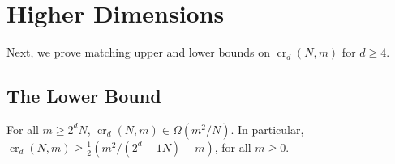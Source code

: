 \documentclass{patmorin}
\newcommand{\n}{N}
\DeclareMathOperator{\crs}{cr}
\begin{document}
\section{Higher Dimensions}

Next, we prove matching upper and lower bounds on $\crs_d(\n,m)$ for
$d\ge 4$.

\subsection{The Lower Bound}

\begin{thm}
  For all $m\ge 2^d\n$, $\crs_d(\n,m)\in\Omega(m^2/\n)$.  In particular,
  $\crs_d(\n,m)\ge \frac{1}{2}(m^2/(2^d-1\n) - m)$, for all $m\ge 0$.
\end{thm}
\end{document}
